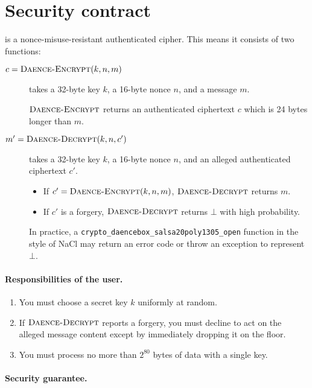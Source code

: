\documentclass{article}
\def\operatorsc#1{{%
  \ifmmode\let\next=\operatorname\else\let\next=\relax\fi\next{\textsc{#1}}}}
\def\DAENCE/{\operatorsc{Daence}}
\def\NaCl/{NaCl}
\DeclareMathOperator{\DaenceEncrypt}{\textsc{Daence-Encrypt}}
\DeclareMathOperator{\DaenceDecrypt}{\textsc{Daence-Decrypt}}
\begin{document}
\section{Security contract}

\DAENCE/ is a nonce-misuse-resistant authenticated cipher.
This means it consists of two functions:
%
\begin{description}
  \item[\normalfont $c = \DaenceEncrypt(k, n, m)$] takes a 32-byte key
     $k$, a 16-byte nonce $n$, and a message $m$.

    $\DaenceEncrypt$ returns an authenticated ciphertext $c$ which is
     24 bytes longer than $m$.

  \item[\normalfont $m' = \DaenceDecrypt(k, n, c')$] takes a 32-byte
     key $k$, a 16-byte nonce $n$, and an alleged authenticated
     ciphertext $c'$.

    \begin{itemize}
      \item If $c' = \DaenceEncrypt(k, n, m)$, $\DaenceDecrypt$
         returns $m$.
      \item If $c'$ is a forgery, $\DaenceDecrypt$ returns $\bot$ with
         high probability.
    \end{itemize}

    In practice, a \texttt{crypto\_daencebox\_salsa20poly1305\_open}
     function in the style of \NaCl/ may return an error code or
     throw an exception to represent $\bot$.
\end{description}

\paragraph*{Responsibilities of the user.}

\begin{enumerate}
  \item You must choose a secret key $k$ uniformly at random.
  \item If $\DaenceDecrypt$ reports a forgery, you must decline to act
     on the alleged message content except by immediately dropping it
     on the floor.
  \item You must process no more than $2^{80}$ bytes of data with a
     single key.
\end{enumerate}

\paragraph*{Security guarantee.}
\end{document}
